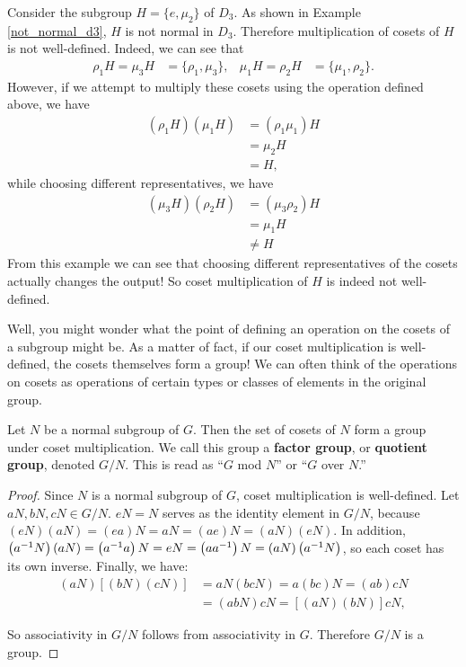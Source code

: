 \begin{example}
Consider the subgroup $H = \{e, \mu_2\}$ of $D_3$. As shown in Example \ref{not_normal_d3}, $H$ is not normal in $D_3$. Therefore multiplication of cosets of $H$ is not well-defined. Indeed, we can see that
\begin{align*}
    \rho_1H = \mu_3H &= \{\rho_1, \mu_3\}, & \mu_1H = \rho_2H &= \{\mu_1, \rho_2\}.
\end{align*}
However, if we attempt to multiply these cosets using the operation defined above, we have
\begin{align*}
    \left(\rho_1H\right)\left(\mu_1H\right) &= \left(\rho_1 \mu_1\right)H \\
    &= \mu_2 H \\
    &= H,
\end{align*}
while choosing different representatives, we have
\begin{align*}
    \left(\mu_3H\right)\left(\rho_2H\right) &= \left(\mu_3 \rho_2\right)H \\
    &= \mu_1 H \\
    &\neq H
\end{align*}
From this example we can see that choosing different representatives of the cosets actually changes the output! So coset multiplication of $H$ is indeed not well-defined.
\end{example}

Well, you might wonder what the point of defining an operation on the cosets of a subgroup might be. As a matter of fact, if our coset multiplication is well-defined, the cosets themselves form a group! We can often think of the operations on cosets as operations of certain types or classes of elements in the original group.

\begin{theorem}
Let $N$ be a normal subgroup of $G$. Then the set of cosets of $N$ form a group under coset multiplication. We call this group a \textbf{factor group}, or \textbf{quotient group}, denoted $G/N$. This is read as ``$G$ mod $N$'' or ``$G$ over $N$.''
\end{theorem}

\begin{proof}
Since $N$ is a normal subgroup of $G$, coset multiplication is well-defined. Let $aN, bN, cN \in G/N$. $eN = N$ serves as the identity element in $G/N$, because $(eN)(aN) = (ea)N = aN = (ae)N = (aN)(eN)$. In addition, $\left(a^{-1} N\right)(aN) = \left(a^{-1} a\right)N = eN = \left(a a^{-1}\right)N = (aN)\left(a^{-1} N\right)$, so each coset has its own inverse. Finally, we have:
\begin{align*}
    (aN)\left[(bN)(cN)\right] &= aN(bcN) = a(bc)N = (ab)cN \\
    &= (abN)cN = \left[(aN)(bN)\right]cN,
\end{align*}

So associativity in $G/N$ follows from associativity in $G$. Therefore $G/N$ is a group.

\end{proof}

